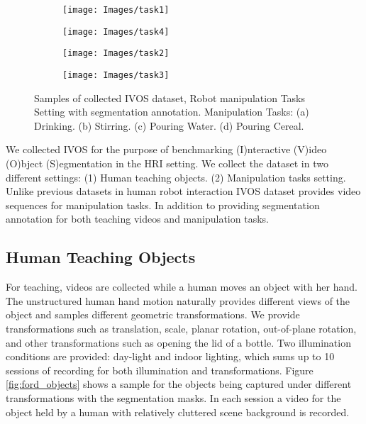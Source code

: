 \documentclass[letterpaper, 10 pt, conference]{ieeeconf}
\begin{document}
\begin{figure*}[ht!]
\centering
\begin{subfigure}{.2\textwidth}
    \texttt{[image: Images/task1]}
    \caption{}
\end{subfigure}\begin{subfigure}{.2\textwidth}
    \texttt{[image: Images/task4]}
    \caption{}
\end{subfigure}\begin{subfigure}{.2\textwidth}
    \texttt{[image: Images/task2]}
    \caption{}
\end{subfigure}\begin{subfigure}{.2\textwidth}
    \texttt{[image: Images/task3]}
    \caption{}
\end{subfigure}
\caption{Samples of collected IVOS dataset, Robot manipulation Tasks Setting with segmentation annotation. Manipulation Tasks: (a) Drinking. (b) Stirring. (c) Pouring Water. (d) Pouring Cereal.}
\label{fig:ford_tasks}
\end{figure*}

We collected IVOS for the purpose of benchmarking (I)nteractive (V)ideo (O)bject (S)egmentation in the HRI setting. We collect the dataset in two different settings: (1) Human teaching objects. (2) Manipulation tasks setting. Unlike previous datasets in human robot interaction IVOS dataset provides video sequences for manipulation tasks. In addition to providing segmentation annotation for both teaching videos and manipulation tasks.

\subsection{Human Teaching Objects}
For teaching, videos are collected while a human moves an object with her hand. The unstructured human hand motion naturally provides different views of the object and samples different geometric transformations. We provide transformations such as translation, scale, planar rotation, out-of-plane rotation, and other transformations such as opening the lid of a bottle. Two illumination conditions are provided: day-light and indoor lighting, which sums up to 10 sessions of recording for both illumination and transformations. Figure \ref{fig:ford_objects} shows a sample for the objects being captured under different transformations with the segmentation masks. In each session a video for the object held by a human with relatively cluttered scene background is recorded.
\end{document}
